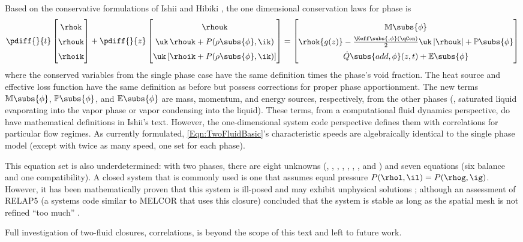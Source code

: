 Based on the conservative formulations of Ishii and Hibiki \cite{ishii_thermo-fluid_2011}, the one dimensional conservation laws for phase \phi is 
\begin{equation}\renewcommand{\arraystretch}{1.5}
    \pdiff{}{t}\begin{bmatrix}
                   \rhok \\
                   \rhouk \\
                   \rhoik 
                \end{bmatrix}
    + 
    \pdiff{}{z}\begin{bmatrix}
                    \rhouk                 \\
                    \uk\,    \rhouk  + P(\rho\subs{\phi},\ik)   \\
                    \uk\left[\rhoik  + P(\rho\subs{\phi},\ik)\right]
                \end{bmatrix}
             =  
    \begin{bmatrix}
        \mathbb{M}\subs{\phi} \\
        \rhok{g(z)} - \frac{\Keff\subs{,\phi}(\qCon)}{2} \uk\,|\rhouk| + \mathbb{P}\subs{\phi}  \\
        \dot{Q}\subs{add,\phi}(z,t) + \mathbb{E}\subs{\phi}
    \end{bmatrix}
    \label{Eqn:TwoFluidBasic}
\end{equation}
where the conserved variables from the single phase case have the same definition times the phase's void fraction.
The heat source and effective loss function have the same definition as before but possess corrections for proper phase apportionment.
The new terms $\mathbb{M}\subs{\phi}$, $\mathbb{P}\subs{\phi} $, and $\mathbb{E}\subs{\phi}$ are mass, momentum, and energy sources, respectively, from the other phases (\ie, saturated liquid evaporating into the vapor phase or vapor condensing into the liquid).
These terms, from a computational fluid dynamics perspective, do have mathematical definitions in Ishii's text.
However, the one-dimensional system code perspective defines them with correlations for particular flow regimes.
As currently formulated, \cref{Eqn:TwoFluidBasic}'s characteristic speeds are algebraically identical to the single phase model (except with twice as many speed, one set for each phase).

This equation set is also underdetermined: with two phases, there are eight unknowns (\rhol, \rhog, \rhoul, \rhoug, \rhoil, \rhoig, \alphal, and \alphag) and seven equations (six balance and one compatibility).
A closed system that is commonly used is one that assumes equal pressure $P(\rhol,\il)=P(\rhog,\ig)$.
However, it has been mathematically proven that this system is ill-posed and may exhibit unphysical solutions \cite{dinh_understanding_2003}; although an assessment of RELAP5 (a systems code similar to MELCOR that uses this closure) concluded that the system is stable as long as the spatial mesh is not refined ``too much'' \cite{shieh_relap5/mod3_1994}.

Full investigation of two-fluid closures, correlations, \etc is beyond the scope of this text and left to future work.

